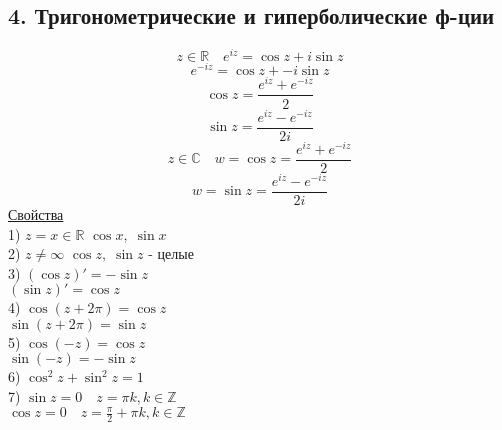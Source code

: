 \documentclass[a4paper]{article}
\begin{document}
    \subsection*{4. Тригонометрические и гиперболические ф-ции}
    \[
        z \in \mathbb{R} \quad e^{iz} = \cos z + i \sin z
    \]
    \[
        e^{-iz} = \cos z + - i \sin z
    \]
    \[
        \cos z = \frac{e^{iz}+ e^{-iz}}{2} 
    \]
    \[
        \sin z = \frac{e^{iz}- e^{-iz}}{2i} 
    \]
    \[
        z \in \mathbb{C} \quad w = \cos z = \frac{e^{iz}+ e^{-iz}}{2}
    \]
    \[
        w = \sin z = \frac{e^{iz}- e^{-iz}}{2i}
    \]
    \underline{Свойства} \\
    1) $ z = x \in \mathbb{R} $ $ \cos x, \; \sin x $ \\
    2) $  z \neq \infty $ $ \cos z, \; \sin z $  - целые \\
    3) $ (\cos z)' = - \sin z $ \\
    $ (\sin z)' = \cos z $ \\
    4) $ \cos(z + 2 \pi) = \cos z $ \\
    $ \sin ( z + 2 \pi) = \sin z $ \\
    5) $ \cos(-z) = \cos z $ \\
    $ \sin(-z) = -\sin z $ \\
    6) $ \cos^2 z  + \sin^2 z = 1 $ \\
    7) $ \sin z  = 0 \quad z = \pi k, k \in \mathbb{Z} $ \\
    $ \cos z  = 0 \quad z = \frac{\pi}{2} + \pi k , k \in \mathbb{Z} $
\end{document}
